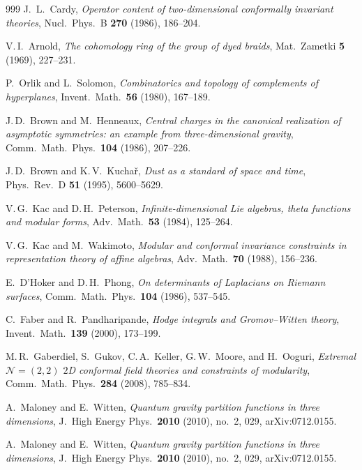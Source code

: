 \documentclass[11pt]{memoir}
\begin{document}
\begin{thebibliography}{999}
J.~L.~Cardy, \emph{Operator content of two-dimensional conformally invariant theories}, Nucl.\ Phys.\ B \textbf{270} (1986), 186--204.


V.\,I.~Arnold, \emph{The cohomology ring of the group of dyed braids}, Mat.\ Zametki \textbf{5} (1969), 227--231.

P.~Orlik and L.~Solomon, \emph{Combinatorics and topology of complements of hyperplanes}, Invent.\ Math.\ \textbf{56} (1980), 167--189.

J.\,D.~Brown and M.~Henneaux, \emph{Central charges in the canonical realization of asymptotic symmetries: an example from three-dimensional gravity}, Comm.\ Math.\ Phys.\ \textbf{104} (1986), 207--226.

J.\,D.~Brown and K.\,V.~Kucha\v{r}, \emph{Dust as a standard of space and time}, Phys.\ Rev.\ D \textbf{51} (1995), 5600--5629.

V.\,G.~Kac and D.\,H.~Peterson, \emph{Infinite-dimensional Lie algebras, theta functions and modular forms}, Adv.\ Math.\ \textbf{53} (1984), 125--264.

V.\,G.~Kac and M.~Wakimoto, \emph{Modular and conformal invariance constraints in representation theory of affine algebras}, Adv.\ Math.\ \textbf{70} (1988), 156--236.

E.~D'Hoker and D.\,H.~Phong, \emph{On determinants of Laplacians on Riemann surfaces}, Comm.\ Math.\ Phys.\ \textbf{104} (1986), 537--545.

C.~Faber and R.~Pandharipande, \emph{Hodge integrals and Gromov--Witten theory}, Invent.\ Math.\ \textbf{139} (2000), 173--199.

M.\,R.~Gaberdiel, S.~Gukov, C.\,A.~Keller, G.\,W.~Moore, and H.~Ooguri, \emph{Extremal $\mathcal{N} = (2,2)$ $2$D conformal field theories and constraints of modularity}, Comm.\ Math.\ Phys.\ \textbf{284} (2008), 785--834.

A.~Maloney and E.~Witten, \emph{Quantum gravity partition functions in three dimensions}, J.\ High Energy Phys.\ \textbf{2010} (2010), no.~2, 029, arXiv:0712.0155.

A.~Maloney and E.~Witten, \emph{Quantum gravity partition functions in three dimensions}, J.\ High Energy Phys.\ \textbf{2010} (2010), no.~2, 029, arXiv:0712.0155.


\end{thebibliography}
\end{document}
